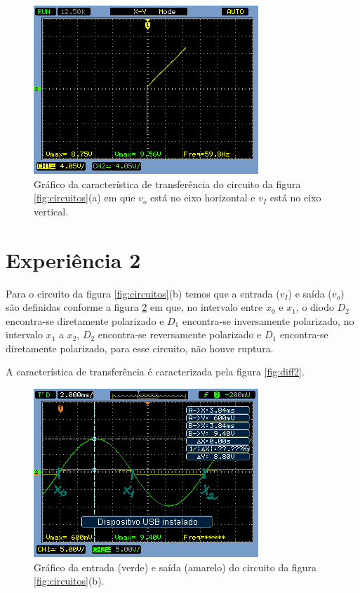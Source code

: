 \documentclass{abntex2}
\begin{document}
\begin{figure}[h]
  \centering
  \includegraphics[width=.8\textwidth]{diferenca-1a.png}
  \caption{Gráfico da característica de transferência do circuito da figura \ref{fig:circuitos}(a) em que $v_o$ está no eixo horizontal e $v_I$ está no eixo vertical.}
  \label{fig:diff1}
\end{figure}

\section{Experiência 2}

Para o circuito da figura \ref{fig:circuitos}(b) temos que a entrada ($v_I$) e saída ($v_o$) são definidas conforme a figura \ref{fig:io2}  em que, no intervalo entre $x_0$ e $x_1$, o diodo $D_2$ encontra-se diretamente polarizado e $D_1$ encontra-se inversamente polarizado, no intervalo $x_1$ a $x_2$, $D_2$ encontra-se reversamente polarizado e $D_1$ encontra-se diretamente polarizado, para esse circuito, não houve ruptura.

A característica de transferência é caracterizada pela figura \ref{fig:diff2}.

\begin{figure}[h]
  \centering
  \includegraphics[width=.8\textwidth]{circuito-1b-esboco2.png}
  \caption{Gráfico da entrada (verde) e saída (amarelo) do circuito da figura \ref{fig:circuitos}(b).}
  \label{fig:io2}
\end{figure}
\end{document}
